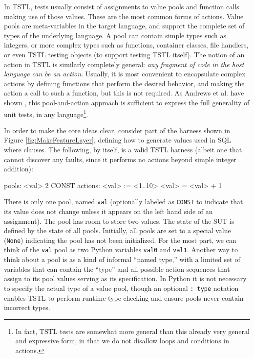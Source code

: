 In TSTL, tests usually consist of assignments to value pools and
function calls making use of those values.  These are the most common
forms of actions.  Value pools are meta-variables in the target
language, and support the complete set of types of the underlying
language.  A pool can contain simple types such as integers, or more
complex types such as functions, container classes, file handlers, or
even TSTL testing objects (to support testing TSTL itself).  The
notion of an action in TSTL is similarly completely general:
\emph{any fragment of code in the host language can be an action}.
Usually, it is most convenient to encapsulate complex actions by
defining functions that perform the desired behavior, and making the
action a call to such a function, but this is not required.  As
Andrews et al. have shown \cite{AndrewsTR}, this pool-and-action approach is
sufficient to express the full generality of unit tests, in any
language\footnote{In fact, TSTL tests are somewhat more general than
  this already very general and expressive form, in that we do not
  disallow loops and conditions in actions.}.

In order to make the core ideas clear,
consider part of the harness shown in Figure \ref{fig:MakeFeatureLayer}, defining how to
generate values used in SQL where clauses.  The following, by itself,
is a valid TSTL harness (albeit one that cannot discover any
faults, since it performs no actions beyond simple integer addition):

{\scriptsize
\begin{code}
pools:
  <val> 2 CONST
\vspace{0.05in}
actions:
\vspace{0.05in}
<val> := <1..10>
<val> = <val> + 1
\end{code}
}

There is only one pool, named {\tt val} (optionally labeled as {\tt CONST} to
indicate that its value does not change unless it appears on the left
hand side of an assignment).  The pool has room to store
two values.  The state of the SUT is defined by the state of all
pools.  Initially, all pools are set to a special value ({\tt None}) indicating the
pool has not been initialized.  For the most part, we can think of the
{\tt val} pool as two Python variables {\tt val0} and {\tt val1}.  Another
way to think about a pool is as a kind of informal ``named type,''
with a limited set of variables that can contain the ``type'' and all
possible action sequences that assign to its pool values serving as
its specification.  In Python it is not necessary to specify the
actual type
of a value pool, though an optional {\tt : type} notation enables TSTL
to perform runtime type-checking and ensure pools never contain
incorrect types.

